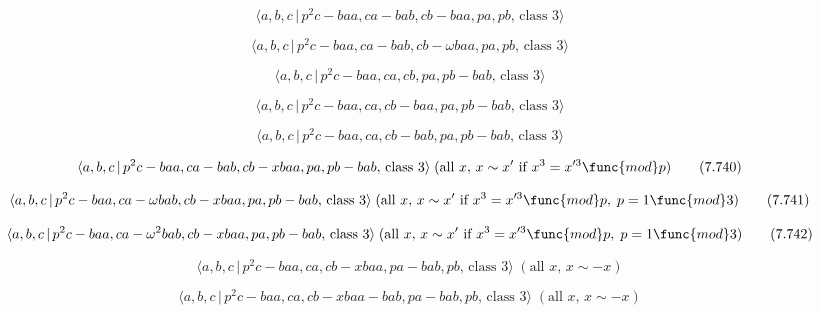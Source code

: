 \documentclass[10pt]{article}
\begin{document}
\begin{equation}
\langle a,b,c\,|\,p^2c-baa,ca-bab,cb-baa,pa,pb,\,\text{class }3\rangle 
\tag{7.735}
\end{equation}

\begin{equation}
\langle a,b,c\,|\,p^{2}c-baa,ca-bab,cb-\omega baa,pa,pb,\,\text{class }%
3\rangle  \tag{7.736}
\end{equation}

\begin{equation}
\langle a,b,c\,|\,p^2c-baa,ca,cb,pa,pb-bab,\,\text{class }3\rangle 
\tag{7.737}
\end{equation}

\begin{equation}
\langle a,b,c\,|\,p^2c-baa,ca,cb-baa,pa,pb-bab,\,\text{class }3\rangle 
\tag{7.738}
\end{equation}

\begin{equation}
\langle a,b,c\,|\,p^2c-baa,ca,cb-bab,pa,pb-bab,\,\text{class }3\rangle 
\tag{7.739}
\end{equation}

\begin{equation}
\langle a,b,c\,|\,p^{2}c-baa,ca-bab,cb-xbaa,pa,pb-bab,\,\text{class }%
3\rangle \;(\text{all }x,\,x \sim x^{\prime }\text{ if }x^3=x^{\prime 3}%
\func{mod}p)  \tag{7.740}
\end{equation}

\begin{equation}
\langle a,b,c\,|\,p^{2}c-baa,ca-\omega bab,cb-xbaa,pa,pb-bab,\,\text{class }%
3\rangle \;(\text{all }x,\,x \sim x^{\prime }\text{ if }x^3=x^{\prime 3}%
\func{mod}p,\;p=1\func{mod}3)  \tag{7.741}
\end{equation}

\begin{equation}
\langle a,b,c\,|\,p^{2}c-baa,ca-\omega ^{2}bab,cb-xbaa,pa,pb-bab,\,\text{%
class }3\rangle \;(\text{all }x,\,x \sim x^{\prime }\text{ if }x^3=x^{\prime
3}\func{mod}p,\;p=1\func{mod}3)  \tag{7.742}
\end{equation}

\begin{equation}
\langle a,b,c\,|\,p^{2}c-baa,ca,cb-xbaa,pa-bab,pb,\,\text{class }3\rangle \;(%
\text{all }x,\,x\sim -x)  \tag{7.743}
\end{equation}

\begin{equation}
\langle a,b,c\,|\,p^{2}c-baa,ca,cb-xbaa-bab,pa-bab,pb,\,\text{class }%
3\rangle \;(\text{all }x,\,x\sim -x)  \tag{7.744}
\end{equation}
\end{document}
